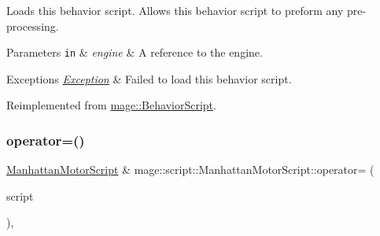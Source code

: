 Loads this behavior script. Allows this behavior script to preform any pre-\/processing.


\begin{DoxyParams}[1]{Parameters}
\mbox{\tt in}  & {\em engine} & A reference to the engine. \\
\hline
\end{DoxyParams}

\begin{DoxyExceptions}{Exceptions}
{\em \mbox{\hyperlink{classmage_1_1_exception}{Exception}}} & Failed to load this behavior script. \\
\hline
\end{DoxyExceptions}


Reimplemented from \mbox{\hyperlink{classmage_1_1_behavior_script_ae7864876b2ffb1d1d8d8a56e3099f1f2}{mage\+::\+Behavior\+Script}}.

\mbox{\label{classmage_1_1script_1_1_manhattan_motor_script_a1c4dc4ffae903942248c7f744b0d019f}} 
\subsubsection{\texorpdfstring{operator=()}{operator=()}\hspace{0.1cm}{\footnotesize\ttfamily [1/2]}}
{\footnotesize\ttfamily \mbox{\hyperlink{classmage_1_1script_1_1_manhattan_motor_script}{Manhattan\+Motor\+Script}} \& mage\+::script\+::\+Manhattan\+Motor\+Script\+::operator= (\begin{DoxyParamCaption}\item[{const \mbox{\hyperlink{classmage_1_1script_1_1_manhattan_motor_script}{Manhattan\+Motor\+Script}} \&}]{script }\end{DoxyParamCaption})\hspace{0.3cm}{\ttfamily [default]}, {\ttfamily [noexcept]}}

\mbox{\label{classmage_1_1script_1_1_manhattan_motor_script_a3184ea5b921fbdbd81173db3f7042a0c}} 
